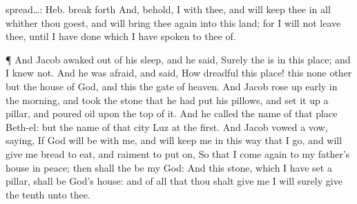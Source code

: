 {{spread…: Heb. break forth}
And, behold, I
{} with thee, and will
keep thee in all
{}
whither thou
goest, and will bring thee
again into this
land; for I will not
leave thee,
until I have
done
{} which I have
spoken to thee of.
\par }{\PP {}¶ And
Jacob
awaked out of his
sleep, and he
said,
Surely the
{}
is in this
place; and I
knew
{} not.
And he was
afraid, and
said, How
dreadful
{} this
place! this
{} none other but the
house of
God, and this
{} the
gate of
heaven.
And
Jacob rose up
early in the
morning, and
took the
stone that he had
put
{} his
pillows, and set it
up
{} a
pillar, and
poured
oil upon the top of
it.
And he
called the
name of that
place
Beth-el:
but the
name of that
city
{}
Luz at the
first.
And
Jacob
vowed a
vow,
saying, If
God will be with me, and will keep
me in this
way that I
go, and will
give me
bread to
eat, and
raiment to put
on,
So that I come
again to my
father’s
house in
peace; then shall the
{} be my
God:
And this
stone, which I have
set
{} a
pillar, shall be
God’s
house: and of all that thou shalt
give me I will
surely give the
tenth unto thee.

}
